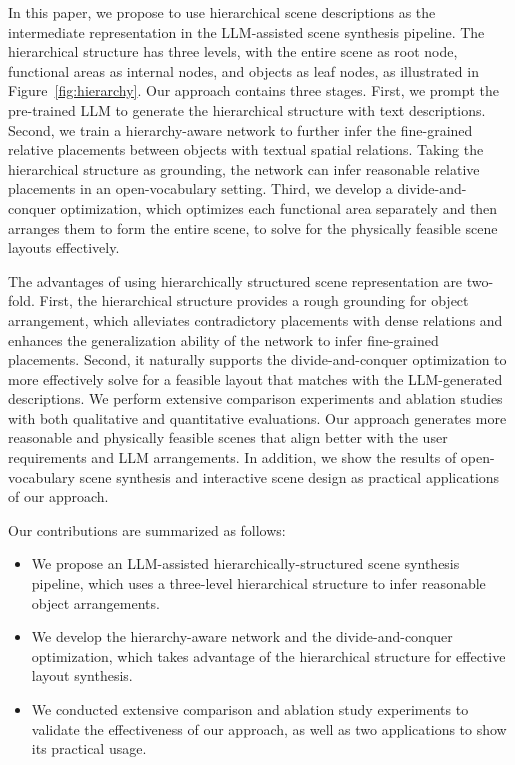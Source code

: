In this paper, we propose to use hierarchical scene descriptions as the intermediate representation in the LLM-assisted scene synthesis pipeline. The hierarchical structure has three levels, with the entire scene as root node, functional areas as internal nodes, and objects as leaf nodes, as illustrated in Figure~\ref{fig:hierarchy}. Our approach contains three stages. First, we prompt the pre-trained LLM to generate the hierarchical structure with text descriptions. Second, we train a hierarchy-aware network to further infer the fine-grained relative placements between objects with textual spatial relations. Taking the hierarchical structure as grounding, the network can infer reasonable relative placements in an open-vocabulary setting. Third, we develop a divide-and-conquer optimization, which optimizes each functional area separately and then arranges them to form the entire scene, to solve for the physically feasible scene layouts effectively.

The advantages of using hierarchically structured scene representation are two-fold. First, the hierarchical structure provides a rough grounding for object arrangement, which alleviates contradictory placements with dense relations and enhances the generalization ability of the network to infer fine-grained placements. Second, it naturally supports the divide-and-conquer optimization to more effectively solve for a feasible layout that matches with the LLM-generated descriptions. We perform extensive comparison experiments and ablation studies with both qualitative and quantitative evaluations. Our approach generates more reasonable and physically feasible scenes that align better with the user requirements and LLM arrangements. In addition, we show the results of open-vocabulary scene synthesis and interactive scene design as practical applications of our approach.

Our contributions are summarized as follows:
\begin{itemize}
\item We propose an LLM-assisted hierarchically-structured scene synthesis pipeline, which uses a three-level hierarchical structure to infer reasonable object arrangements.
\item We develop the hierarchy-aware network and the divide-and-conquer optimization, which takes advantage of the hierarchical structure for effective layout synthesis.
\item We conducted extensive comparison and ablation study experiments to validate the effectiveness of our approach, as well as two applications to show its practical usage.
\end{itemize}

